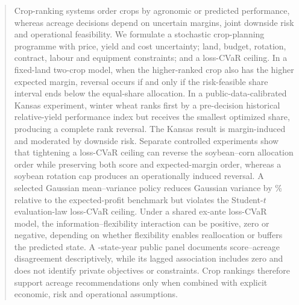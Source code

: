 \begin{abstract}
Crop-ranking systems order crops by agronomic or predicted performance, whereas
acreage decisions depend on uncertain margins, joint downside risk and
operational feasibility. We formulate a stochastic crop-planning programme
with price, yield and cost uncertainty; land, budget, rotation, contract,
labour and equipment constraints; and a loss-CVaR ceiling. In a fixed-land
two-crop model, when the higher-ranked crop also has the higher expected margin,
reversal occurs if and only if the risk-feasible share interval ends below the
equal-share allocation. In a
public-data-calibrated Kansas experiment, winter wheat ranks first by a
pre-decision historical relative-yield performance index but receives the
smallest optimized share, producing a complete rank reversal. The Kansas
result is margin-induced and moderated by downside risk. Separate controlled
experiments show that tightening a loss-CVaR ceiling can
reverse the soybean--corn allocation order while preserving both score and
expected-margin order, whereas a soybean rotation cap produces an
operationally induced reversal. A selected Gaussian mean--variance policy
reduces Gaussian variance by \DiversificationVarianceReduction\% relative to
the expected-profit benchmark but violates the Student-\(t\) evaluation-law
loss-CVaR ceiling. Under a shared ex-ante loss-CVaR model, the
information--flexibility interaction can be positive, zero or negative,
depending on whether flexibility enables reallocation or buffers the predicted
state. A \StateYears{}-state-year public panel documents score--acreage
disagreement descriptively, while its lagged association includes zero and
does not identify private objectives or constraints. Crop rankings therefore
support acreage recommendations only when combined with explicit economic,
risk and operational assumptions.
\end{abstract}
